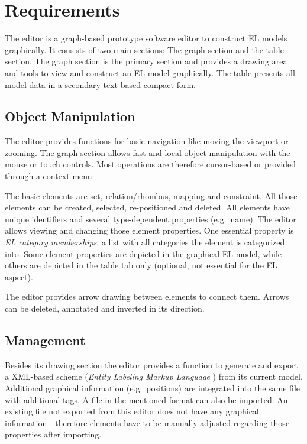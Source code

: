 \documentclass[twoside, openright, 12pt]{book}
\begin{document}
\section{Requirements}
\label{editor_requirements}
The editor is a graph-based prototype software editor to construct EL models graphically.
It consists of two main sections: The graph section and the table section.
The graph section is the primary section and provides a drawing area and tools to view and construct an EL model graphically.
The table presents all model data in a secondary text-based compact form.



\subsection{Object Manipulation}
\label{req_object_manipulation}
The editor provides functions for basic navigation like moving the viewport or zooming.
The graph section allows fast and local object manipulation with the mouse or touch controls.
Most operations are therefore cursor-based or provided through a context menu.

The basic elements are set, relation/rhombus, mapping and constraint.
All those elements can be created, selected, re-positioned and deleted.
All elements have unique identifiers and several type-dependent properties (e.g.\ name).
The editor allows viewing and changing those element properties.
One essential property is \textit{EL category memberships}, a list with all categories the element is categorized into.
Some element properties are depicted in the graphical EL model, while others are depicted in the table tab only (optional; not essential for the EL aspect).

The editor provides arrow drawing between elements to connect them.
Arrows can be deleted, annotated and inverted in its direction.



\subsection{Management}
\label{req_management}
Besides its drawing section the editor provides a function to generate and export a XML-based scheme (\textit{Entity Labeling Markup Language} \citep{Amthor18}) from its current model.
Additional graphical information (e.g.\ positions) are integrated into the same file with additional tags.
A file in the mentioned format can also be imported.
An existing file not exported from this editor does not have any graphical information - therefore elements have to be manually adjusted regarding those properties after importing.
\end{document}
